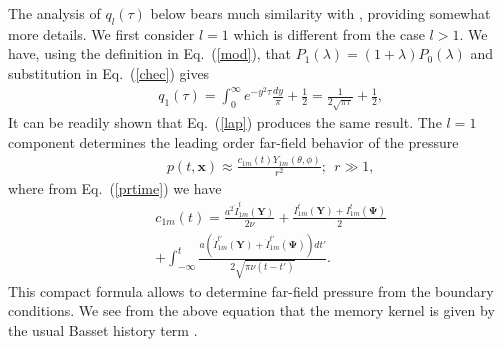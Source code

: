 \documentclass[aps,prx,twocolumn,amsmath,amssymb,amsfonts]{revtex4-2}
\begin{document}
The analysis of $q_l(\tau)$ below bears much similarity with \cite{Ishimoto}, providing somewhat more details.
We first consider $l=1$ which is different from the case $l>1$. We have, using the definition in Eq.~(\ref{mod}), that $P_1(\lambda)=(1+\lambda)P_0(\lambda)$
and substitution in Eq.~(\ref{chec}) gives
\begin{eqnarray}&&\!\!\!\!\!\!\!\!\!
q_1(\tau)\!=\!\!\int_{0}^{\infty}\!\!\! e^{-y^2\tau}\frac{dy}{\pi}+\frac{1}{2}\!=\!\frac{1}{2\sqrt{\pi\tau}}+\frac{1}{2},
\end{eqnarray}
It can be readily shown that Eq.~(\ref{lap}) produces the same result.
The $l=1$ component determines the leading order far-field behavior of the pressure
\begin{eqnarray}&&
p(t, \bm x)\!\approx \!\frac{c_{1m}(t)Y_{1m}(\theta, \phi)}{r^2};\ \ r\gg 1,\label{f}
\end{eqnarray}
where from Eq.~(\ref{prtime}) we have
\begin{eqnarray}&&
c_{1m}(t)\!=\!\frac{a^2 \dot{I}_{1m}^{t}(\bm Y)}{2\nu}+\frac{I_{1m}^{t}(\bm Y)\!+\!I_{1m}^{t}(\bm \Psi)}{2}
\label{c1m}\\&&
+\int_{-\infty}^{t}\frac{a\left(\dot{I}_{1m}^{t'}(\bm Y)\!+\!\dot{I}_{1m}^{t'}(\bm \Psi)\right)dt'}{2\sqrt{\pi \nu (t-t')}} . \nonumber
\end{eqnarray}
This compact formula allows to determine far-field pressure from the boundary conditions. We see from the above equation that the memory kernel is given by the usual Basset history term \cite{kim,LL}.
\end{document}

